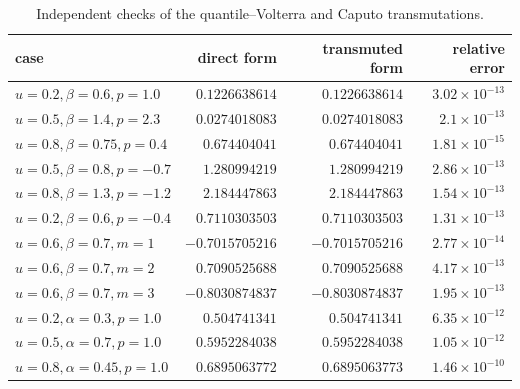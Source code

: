 \begin{table}[htbp]
\centering\small
\caption{Independent checks of the quantile--Volterra and Caputo transmutations.}
\label{p11:tab:quantile-checks}
\begin{tabular}{@{}lrrr@{}}
\toprule
case & direct form & transmuted form & relative error\\
\midrule
$u=0.2,\beta=0.6,p=1.0$ & $0.1226638614$ & $0.1226638614$ & $3.02\mathbin{\times}10^{-13}$\\
$u=0.5,\beta=1.4,p=2.3$ & $0.0274018083$ & $0.0274018083$ & $2.1\mathbin{\times}10^{-13}$\\
$u=0.8,\beta=0.75,p=0.4$ & $0.674404041$ & $0.674404041$ & $1.81\mathbin{\times}10^{-15}$\\
$u=0.5,\beta=0.8,p=-0.7$ & $1.280994219$ & $1.280994219$ & $2.86\mathbin{\times}10^{-13}$\\
$u=0.8,\beta=1.3,p=-1.2$ & $2.184447863$ & $2.184447863$ & $1.54\mathbin{\times}10^{-13}$\\
$u=0.2,\beta=0.6,p=-0.4$ & $0.7110303503$ & $0.7110303503$ & $1.31\mathbin{\times}10^{-13}$\\
$u=0.6,\beta=0.7,m=1$ & $-0.7015705216$ & $-0.7015705216$ & $2.77\mathbin{\times}10^{-14}$\\
$u=0.6,\beta=0.7,m=2$ & $0.7090525688$ & $0.7090525688$ & $4.17\mathbin{\times}10^{-13}$\\
$u=0.6,\beta=0.7,m=3$ & $-0.8030874837$ & $-0.8030874837$ & $1.95\mathbin{\times}10^{-13}$\\
$u=0.2,\alpha=0.3,p=1.0$ & $0.504741341$ & $0.504741341$ & $6.35\mathbin{\times}10^{-12}$\\
$u=0.5,\alpha=0.7,p=1.0$ & $0.5952284038$ & $0.5952284038$ & $1.05\mathbin{\times}10^{-12}$\\
$u=0.8,\alpha=0.45,p=1.0$ & $0.6895063772$ & $0.6895063773$ & $1.46\mathbin{\times}10^{-10}$\\
\bottomrule
\end{tabular}
\end{table}


